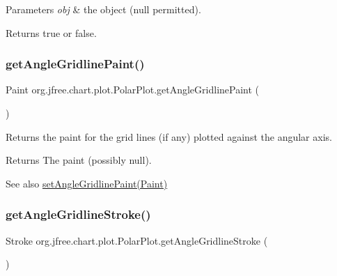\begin{DoxyParams}{Parameters}
{\em obj} & the object ({\ttfamily null} permitted).\\
\hline
\end{DoxyParams}
\begin{DoxyReturn}{Returns}
{\ttfamily true} or {\ttfamily false}. 
\end{DoxyReturn}
\mbox{\label{classorg_1_1jfree_1_1chart_1_1plot_1_1_polar_plot_a00462036e7ec80bdf00e78b0aea657f2}} 
\subsubsection{\texorpdfstring{get\+Angle\+Gridline\+Paint()}{getAngleGridlinePaint()}}
{\footnotesize\ttfamily Paint org.\+jfree.\+chart.\+plot.\+Polar\+Plot.\+get\+Angle\+Gridline\+Paint (\begin{DoxyParamCaption}{ }\end{DoxyParamCaption})}

Returns the paint for the grid lines (if any) plotted against the angular axis.

\begin{DoxyReturn}{Returns}
The paint (possibly {\ttfamily null}).
\end{DoxyReturn}
\begin{DoxySeeAlso}{See also}
\mbox{\hyperlink{classorg_1_1jfree_1_1chart_1_1plot_1_1_polar_plot_aa1b26ecd352af4353c51534276d45f1a}{set\+Angle\+Gridline\+Paint(\+Paint)}} 
\end{DoxySeeAlso}
\mbox{\label{classorg_1_1jfree_1_1chart_1_1plot_1_1_polar_plot_ae470d6938a98ac9f390c401538c3b546}} 
\subsubsection{\texorpdfstring{get\+Angle\+Gridline\+Stroke()}{getAngleGridlineStroke()}}
{\footnotesize\ttfamily Stroke org.\+jfree.\+chart.\+plot.\+Polar\+Plot.\+get\+Angle\+Gridline\+Stroke (\begin{DoxyParamCaption}{ }\end{DoxyParamCaption})}

